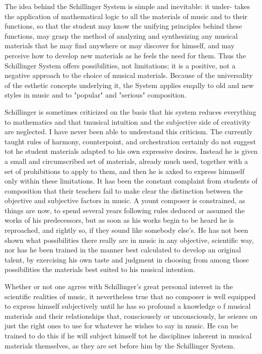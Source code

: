 The idea behind the Schillinger System is simple and inevitable: it under-
takes the application of mathematical logic to all the materials of music and
to their functions, so that the student may know the unifying principles behind
these functions, may grasp the method of analyzing and synthesizing any musical
materials that he may find anywhere or may discover for himself, and may
perceive how to develop new materials as he feels the need for them. Thus the
Schillinger System offers possibilities, not limitations; it is a positive, not
a negative approach to the choice  of musical materials. Because of the
universality of the esthetic concepts underlying it, the System applies euqally
to old and new styles in music and to "popular" and "serious" composition.

Schillinger is sometimes criticized on the basis that his system reduces
everything to mathematics and that tmusical intuition and the subjective side
of creativity are neglected. I have never been able to understand this
criticism. The currently taught rules of harmony, counterpoint, and
orchestration certainly do not suggest tot he student materials adapted to his
own expressive desires. Instead he is given a small and circumscribed set of materials, already much used, together with a set of prohibitions to apply to them, and then he is axked to express himnself only within these limitations. It has been the constant complaint from students of composition that their teachers fail to make clear the distinction between the objective and subjective factors in music. A yount composer is constrained, as things are now, to spend several years following rules deduced or assumed the works of his predecessors, but as soon as his works begin to be heard he is reproached, and rightly so, if they sound like somebody else's. He has not been shown what possibilities there really are in music in any objective, scientific way, nor has he been trained in the manner best calculated to develop an original talent, by exercising his own taste and judgment in choosing from among those possibilities the materials best suited to his musical intention.

Whether or not one agrres with Schillinger's great personal interest in the scientific realities of music, it nevertheless true that no composer is well equipped to express himself subjectively until he has so profound a knowledge o f musical materials and their relationships that, consciouscly or unconsciously, he seiezes on just the right ones to use for whatever he wishes to say in music. He can be trained to do this if he will subject himself tot he disciplines inherent in musical materials themselves, as they are set before him by the Schillinger System.


